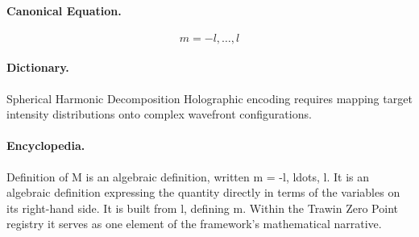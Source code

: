 \paragraph{Canonical Equation.}
\[
m = -l, \ldots, l
\]

\paragraph{Dictionary.}
Spherical Harmonic Decomposition Holographic encoding requires mapping target intensity distributions onto complex wavefront configurations.

\paragraph{Encyclopedia.}
Definition of M is an algebraic definition, written m = -l, ldots, l. It is an algebraic definition expressing the quantity directly in terms of the variables on its right-hand side. It is built from l, defining m. Within the Trawin Zero Point registry it serves as one element of the framework's mathematical narrative.
